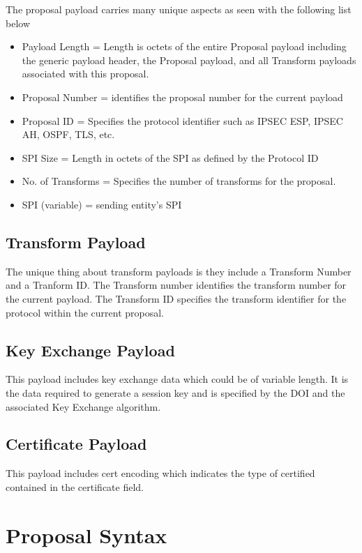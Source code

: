 \documentclass{article}
\begin{document}
The proposal payload carries many unique aspects as seen with the following list below

\begin{itemize}
\item Payload Length = Length is octets of the entire Proposal payload including the generic payload header, the Proposal payload, and all Transform payloads associated with this proposal.
\item Proposal Number = identifies the proposal number for the current payload
\item Proposal ID = Specifies the protocol identifier such as IPSEC ESP, IPSEC AH, OSPF, TLS, etc.
\item SPI Size = Length in octets of the SPI as defined by the Protocol ID
\item No. of Transforms = Specifies the number of transforms for the proposal.
\item SPI (variable) = sending entity's SPI
\end{itemize}

\subsection {Transform Payload}

The unique thing about transform payloads is they include a Transform Number and a Tranform ID. The Transform number identifies the transform number for the current payload. The Transform ID specifies the transform identifier for the protocol within the current proposal. 

\subsection {Key Exchange Payload}

This payload includes key exchange data which could be of variable length. It is the data required to generate a session key and is specified by the DOI and the associated Key Exchange algorithm.

\subsection {Certificate Payload}

This payload includes cert encoding which indicates the type of certified contained in the certificate field. 

\section {Proposal Syntax}
\end{document}
